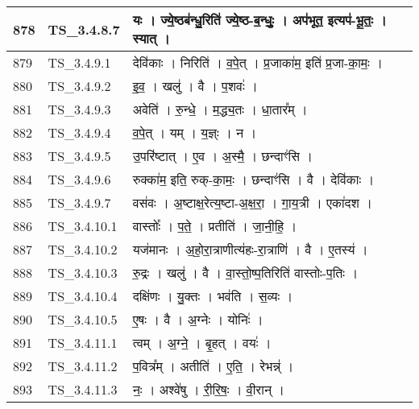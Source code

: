 \documentclass[17pt]{extarticle}
\begin{document}
\begin{longtable}{||p{0.4in}||p{0.9in}||p{4.0in}||p{0.9in}||}
        \hline
            878 & TS\_3.4.8.7 & यः   ।   ज्ये॒ष्ठब॑न्धु॒रिति॑ ज्ये॒ष्ठ{-}ब॒न्धुः॒   ।   अप॑भूत॒ इत्यप॑{-}भू॒तः॒   ।   स्यात्   ।    &      \\
        \hline
            879 & TS\_3.4.9.1 & देवि॑काः   ।   निरिति॑   ।   व॒पे॒त्   ।   प्र॒जाका॑म॒ इति॑ प्र॒जा{-}का॒मः॒   ।    &      \\
        \hline
            880 & TS\_3.4.9.2 & इ॒व॒   ।   खलु॑   ।   वै   ।   प॒शवः॑   ।    &      \\
        \hline
            881 & TS\_3.4.9.3 & अवेति॑   ।   रु॒न्धे॒   ।   म॒द्ध्य॒तः   ।   धा॒तार᳚म्   ।    &      \\
        \hline
            882 & TS\_3.4.9.4 & व॒पे॒त्   ।   यम्   ।   य॒ज्ञ्ः   ।   न   ।    &      \\
        \hline
            883 & TS\_3.4.9.5 & उ॒परि॑ष्टात्   ।   ए॒व   ।   अ॒स्मै॒   ।   छन्दाꣳ॑सि   ।    &      \\
        \hline
            884 & TS\_3.4.9.6 & रुक्का॑म॒ इति॒ रुक्{-}का॒मः॒   ।   छन्दाꣳ॑सि   ।   वै   ।   देवि॑काः   ।    &      \\
        \hline
            885 & TS\_3.4.9.7 & वस॑वः   ।   अ॒ष्टाक्ष॒रेत्य॒ष्टा{-}अ॒क्ष॒रा॒   ।   गा॒य॒त्री   ।   एका॑दश   ।    &      \\
        \hline
            886 & TS\_3.4.10.1 & वास्तोः᳚   ।   प॒ते॒   ।   प्रतीति॑   ।   जा॒नी॒हि॒   ।    &      \\
        \hline
            887 & TS\_3.4.10.2 & यज॑मानः   ।   अ॒हो॒रा॒त्राणीत्य॑हः{-}रा॒त्राणि॑   ।   वै   ।   ए॒तस्य॑   ।    &      \\
        \hline
            888 & TS\_3.4.10.3 & रु॒द्रः   ।   खलु॑   ।   वै   ।   वा॒स्तो॒ष्प॒तिरिति॑ वास्तोः{-}प॒तिः   ।    &      \\
        \hline
            889 & TS\_3.4.10.4 & दक्षि॑णः   ।   यु॒क्तः   ।   भव॑ति   ।   स॒व्यः   ।    &      \\
        \hline
            890 & TS\_3.4.10.5 & ए॒षः   ।   वै   ।   अ॒ग्नेः   ।   योनिः॑   ।    &      \\
        \hline
            891 & TS\_3.4.11.1 & त्वम्   ।   अ॒ग्ने॒   ।   बृ॒हत्   ।   वयः॑   ।    &      \\
        \hline
            892 & TS\_3.4.11.2 & प॒वित्र᳚म्   ।   अतीति॑   ।   ए॒ति॒   ।   रेभन्न्॑   ।    &      \\
        \hline
            893 & TS\_3.4.11.3 & नः॒   ।   अश्वे॑षु   ।   री॒रि॒षः॒   ।   वी॒रान्   ।    &      \\
        \hline

\end{longtable}
\end{document}
